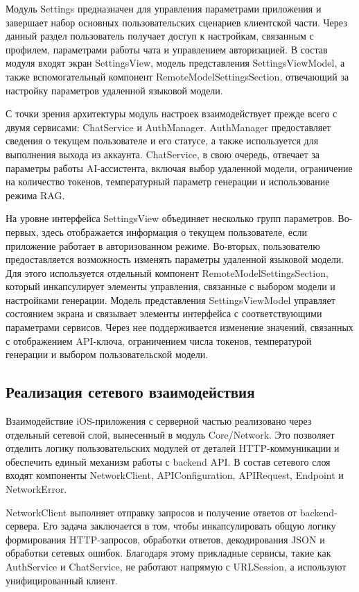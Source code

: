 Модуль Settings предназначен для управления параметрами приложения и завершает набор основных пользовательских сценариев клиентской части. Через данный раздел пользователь получает доступ к настройкам, связанным с профилем, параметрами работы чата и управлением авторизацией. В состав модуля входят экран SettingsView, модель представления SettingsViewModel, а также вспомогательный компонент RemoteModelSettingsSection, отвечающий за настройку параметров удаленной языковой модели.


С точки зрения архитектуры модуль настроек взаимодействует прежде всего с двумя сервисами: ChatService и AuthManager. AuthManager предоставляет сведения о текущем пользователе и его статусе, а также используется для выполнения выхода из аккаунта. ChatService, в свою очередь, отвечает за параметры работы AI-ассистента, включая выбор удаленной модели, ограничение на количество токенов, температурный параметр генерации и использование режима RAG.


На уровне интерфейса SettingsView объединяет несколько групп параметров. Во-первых, здесь отображается информация о текущем пользователе, если приложение работает в авторизованном режиме. Во-вторых, пользователю предоставляется возможность изменять параметры удаленной языковой модели. Для этого используется отдельный компонент RemoteModelSettingsSection, который инкапсулирует элементы управления, связанные с выбором модели и настройками генерации. Модель представления SettingsViewModel управляет состоянием экрана и связывает элементы интерфейса с соответствующими параметрами сервисов. Через нее поддерживается изменение значений, связанных с отображением API-ключа, ограничением числа токенов, температурой генерации и выбором пользовательской модели.


\subsection{Реализация сетевого взаимодействия}


Взаимодействие iOS-приложения с серверной частью реализовано через отдельный сетевой слой, вынесенный в модуль Core/Network. Это позволяет отделить логику пользовательских модулей от деталей HTTP-коммуникации и обеспечить единый механизм работы с backend API. В состав сетевого слоя входят компоненты NetworkClient, APIConfiguration, APIRequest, Endpoint и NetworkError.


NetworkClient выполняет отправку запросов и получение ответов от backend-сервера. Его задача заключается в том, чтобы инкапсулировать общую логику формирования HTTP-запросов, обработки ответов, декодирования JSON и обработки сетевых ошибок. Благодаря этому прикладные сервисы, такие как AuthService и ChatService, не работают напрямую с URLSession, а используют унифицированный клиент.


